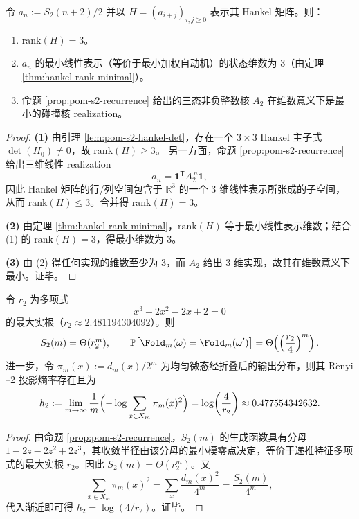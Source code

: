 \begin{theorem}\label{thm:pom-s2-rank-exact}
令 \(a_n:=S_2(n+2)/2\) 并以 \(H=(a_{i+j})_{i,j\ge 0}\) 表示其 Hankel 矩阵。则：
\begin{enumerate}
  \item \(\mathrm{rank}(H)=3\)。
  \item \(a_n\) 的最小线性表示（等价于最小加权自动机）的状态维数为 \(3\)（由定理 \ref{thm:hankel-rank-minimal}）。
  \item 命题 \ref{prop:pom-s2-recurrence} 给出的三态非负整数核 \(A_2\) 在维数意义下是最小的碰撞核 realization。
\end{enumerate}
\end{theorem}
\begin{proof}
\textbf{(1)} 由引理 \ref{lem:pom-s2-hankel-det}，存在一个 \(3\times 3\) Hankel 主子式 \(\det(H_0)\neq 0\)，故 \(\mathrm{rank}(H)\ge 3\)。
另一方面，命题 \ref{prop:pom-s2-recurrence} 给出三维线性 realization
$$
a_n=\mathbf{1}^{\mathsf T}A_2^{\,n}\mathbf{1},
$$
因此 Hankel 矩阵的行/列空间包含于 \(\mathbb{R}^3\) 的一个 3 维线性表示所张成的子空间，从而 \(\mathrm{rank}(H)\le 3\)。合并得 \(\mathrm{rank}(H)=3\)。

\textbf{(2)} 由定理 \ref{thm:hankel-rank-minimal}，\(\mathrm{rank}(H)\) 等于最小线性表示维数；结合 (1) 的 \(\mathrm{rank}(H)=3\)，得最小维数为 \(3\)。

\textbf{(3)} 由 (2) 得任何实现的维数至少为 3，而 \(A_2\) 给出 3 维实现，故其在维数意义下最小。证毕。
\end{proof}

\begin{corollary}\label{cor:pom-s2-asymptotic}
令 \(r_2\) 为多项式
$$
x^3-2x^2-2x+2=0
$$
的最大实根（\(r_2\approx 2.481194304092\)）。则
$$
S_2(m)=\Theta(r_2^m),
\qquad
\mathbb{P}\bigl[\Fold_m(\omega)=\Fold_m(\omega')\bigr]
=\Theta\!\left(\left(\frac{r_2}{4}\right)^m\right).
$$
进一步，令 \(\pi_m(x):=d_m(x)/2^m\) 为均匀微态经折叠后的输出分布，则其 \(\mathrm{R\acute{e}nyi}\)--2 投影熵率存在且为
$$
h_2:=\lim_{m\to\infty}\frac{1}{m}\Bigl(-\log\sum_{x\in X_m}\pi_m(x)^2\Bigr)
=\log\!\left(\frac{4}{r_2}\right)\approx 0.477554342632.
$$
\end{corollary}
\begin{proof}
由命题 \ref{prop:pom-s2-recurrence}，\(S_2(m)\) 的生成函数具有分母 \(1-2z-2z^2+2z^3\)，其收敛半径由该分母的最小模零点决定，等价于递推特征多项式的最大实根 \(r_2\)。因此 \(S_2(m)=\Theta(r_2^m)\)。又
$$
\sum_{x\in X_m}\pi_m(x)^2=\sum_x \frac{d_m(x)^2}{4^m}=\frac{S_2(m)}{4^m},
$$
代入渐近即可得 \(h_2=\log(4/r_2)\)。证毕。
\end{proof}

